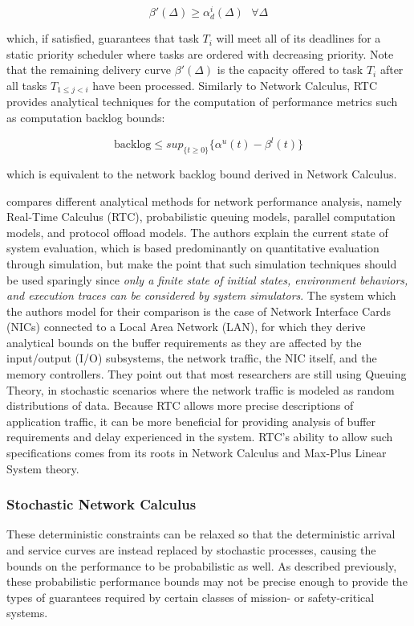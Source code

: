 \begin{equation}
  \beta'(\Delta)\geq\alpha^i_d(\Delta)\ \ \ \forall\Delta
\end{equation}

which, if satisfied, guarantees that task $T_i$ will meet all of its
deadlines for a static priority scheduler where tasks are ordered with
decreasing priority.  Note that the remaining delivery curve
$\beta'(\Delta)$ is the capacity offered to task $T_i$ after all tasks
$T_{1\leq j<i}$ have been processed. Similarly to Network Calculus,
RTC provides analytical techniques for the computation of performance
metrics such as computation backlog bounds:

\begin{equation}
  \text{backlog}\leq sup_{\{t\geq 0\}}\{\alpha^u(t)-\beta^l(t)\}
\end{equation}

which is equivalent to the network backlog bound derived in Network
Calculus.

\cite{RTCcomparison2011} compares different analytical methods for
network performance analysis, namely Real-Time Calculus (RTC),
probabilistic queuing models, parallel computation models, and
protocol offload models.  The authors explain the current state of
system evaluation, which is based predominantly on quantitative
evaluation through simulation, but make the point that such simulation
techniques should be used sparingly since \textit{only a finite state
of initial states, environment behaviors, and execution traces can
be considered by system simulators}.  The system which the authors
model for their comparison is the case of Network Interface Cards
(NICs) connected to a Local Area Network (LAN), for which they derive
analytical bounds on the buffer requirements as they are affected by
the input/output (I/O) subsystems, the network traffic, the NIC
itself, and the memory controllers.  They point out that most
researchers are still using Queuing Theory, in stochastic scenarios
where the network traffic is modeled as random distributions of data.
Because RTC allows more precise descriptions of application traffic,
it can be more beneficial for providing analysis of buffer
requirements and delay experienced in the system.  RTC's ability to
allow such specifications comes from its roots in Network Calculus and
Max-Plus Linear System theory.

\subsubsection{Stochastic Network Calculus}
These deterministic constraints can be relaxed so that the
deterministic arrival and service curves are instead replaced by
stochastic processes, causing the bounds on the performance to be
probabilistic as well\cite{Burchard06amin-plus}.  As described
previously, these probabilistic performance bounds may not be precise
enough to provide the types of guarantees required by certain classes
of mission- or safety-critical systems.

